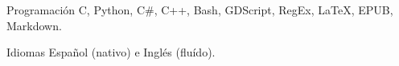 

\begin{cvskills}

  \cvskill
    {Programación} %
    {C, Python, C\#, C++, Bash, GDScript, RegEx, LaTeX, EPUB, Markdown.} %

  \cvskill
    {Idiomas} %
    {Español (nativo) e Inglés (fluído).} %


\end{cvskills}
